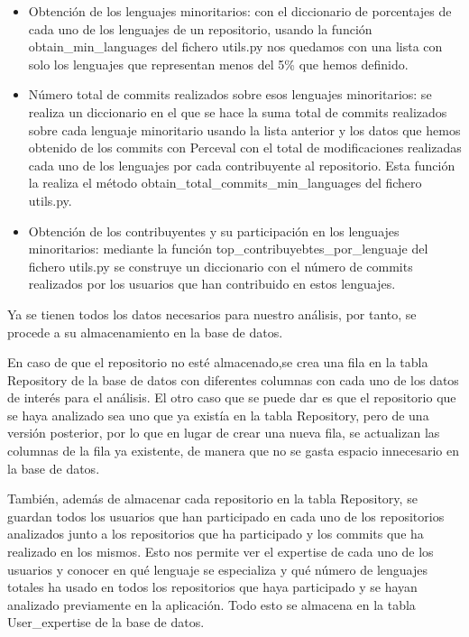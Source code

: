 \documentclass[a4paper, 12pt]{book}
\begin{document}
\begin{itemize}
  \item Obtención de los lenguajes minoritarios: con el diccionario de porcentajes de cada uno de los lenguajes de un repositorio, usando la función obtain\_min\_languages del fichero utils.py nos quedamos con una lista con solo los lenguajes que representan menos del 5\% que hemos definido.
  \item Número total de commits realizados sobre esos lenguajes minoritarios: se realiza un diccionario en el que se hace la suma total de commits realizados sobre cada lenguaje minoritario usando la lista anterior y los datos que hemos obtenido de los commits con Perceval con el total de modificaciones realizadas cada uno de los lenguajes por cada contribuyente al repositorio. Esta función la realiza el método obtain\_total\_commits\_min\_languages del fichero utils.py.
  \item Obtención de los contribuyentes y su participación en los lenguajes minoritarios: mediante la función top\_contribuyebtes\_por\_lenguaje del fichero utils.py se construye un diccionario con el número de commits realizados por los usuarios que han contribuido en estos lenguajes.
\end{itemize}

Ya se tienen todos los datos necesarios para nuestro análisis, por tanto, se procede a su almacenamiento en la base de datos. 

En caso de que el repositorio no esté almacenado,se crea una fila en la tabla Repository de la base de datos con diferentes columnas con cada uno de los datos de interés para el análisis. El otro caso que se puede dar es que el repositorio que se haya analizado sea uno que ya existía en la tabla Repository, pero de una versión posterior, por lo que en lugar de crear una nueva fila, se actualizan las columnas de la fila ya existente, de manera que no se gasta espacio innecesario en la base de datos.

También, además de almacenar cada repositorio en la tabla Repository, se guardan todos los usuarios que han participado en cada uno de los repositorios analizados junto a los repositorios que ha participado y los commits que ha realizado en los mismos. Esto nos permite ver el expertise de cada uno de los usuarios y conocer en qué lenguaje se especializa y qué número de lenguajes totales ha usado en todos los repositorios que haya participado y se hayan analizado previamente en la aplicación. Todo esto se almacena en la tabla User\_expertise de la base de datos.
\end{document}
